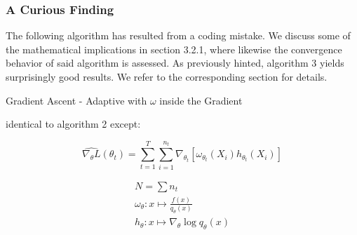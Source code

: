 \subsubsection{A Curious Finding}
The following algorithm has resulted from a coding mistake. We discuss some of the mathematical implications in section 3.2.1, where likewise the convergence behavior of said algorithm is assessed. As previously hinted, algorithm 3 yields surprisingly good results. We refer to the corresponding section for details. 
\begin{algorithm}[H]
    \caption{Gradient Ascent - Adaptive with $\omega$ inside the Gradient}\label{alg:gaAdaptiveWeight}
    \begin{algorithmic}

        \State
        identical to algorithm 2 except:
        

            $$\widehat{\nabla_\theta L}(\theta_t) = \displaystyle\sum\limits_{t=1}^{T}\sum\limits_{i=1}^{n_t} \nabla_{\theta_t} \left[\omega_{\theta_t}(X_i) h_{\theta_t}(X_i)\right]$$ 

            $$\begin{array}{l}
                {N = \sum n_t}
                \\
                {\omega_\theta : x \mapsto \frac{f(x)}{q_\theta(x)}}
                \\
                {h_\theta : x \mapsto \nabla_\theta \log q_\theta(x)}
            \end{array}$$
            
            \bigskip

    \end{algorithmic}
    \end{algorithm}


